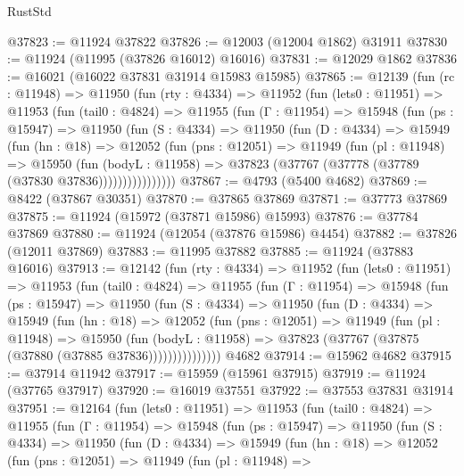 \begin{lexlean}{RustStd}
\begin{coremodule}
@37823 := @11924 @37822
@37826 := @12003 (@12004 @1862) @31911
@37830 := @11924 (@11995 (@37826 @16012) @16016)
@37831 := @12029 @1862
@37836 := @16021 (@16022 @37831 @31914 @15983 @15985)
@37865 := @12139
    (fun (rc : @11948) =>
    @11950
      (fun (rty : @4334) =>
      @11952
        (fun (lets0 : @11951) =>
        @11953
          (fun (tail0 : @4824) =>
          @11955
            (fun (Γ : @11954) =>
            @15948
              (fun (ps : @15947) =>
              @11950
                (fun (S : @4334) =>
                @11950
                  (fun (D : @4334) =>
                  @15949
                    (fun (hn : @18) =>
                    @12052
                      (fun (pns : @12051) =>
                      @11949
                        (fun (pl : @11948) =>
                        @15950
                          (fun (bodyL : @11958) =>
                          @37823 (@37767 (@37778 (@37789 (@37830 @37836))))))))))))))))
@37867 := @4793 (@5400 @4682)
@37869 := @8422 (@37867 @30351)
@37870 := @37865 @37869
@37871 := @37773 @37869
@37875 := @11924 (@15972 (@37871 @15986) @15993)
@37876 := @37784 @37869
@37880 := @11924 (@12054 (@37876 @15986) @4454)
@37882 := @37826 (@12011 @37869)
@37883 := @11995 @37882
@37885 := @11924 (@37883 @16016)
@37913 := @12142
    (fun (rty : @4334) =>
    @11952
      (fun (lets0 : @11951) =>
      @11953
        (fun (tail0 : @4824) =>
        @11955
          (fun (Γ : @11954) =>
          @15948
            (fun (ps : @15947) =>
            @11950
              (fun (S : @4334) =>
              @11950
                (fun (D : @4334) =>
                @15949
                  (fun (hn : @18) =>
                  @12052
                    (fun (pns : @12051) =>
                    @11949
                      (fun (pl : @11948) =>
                      @15950
                        (fun (bodyL : @11958) =>
                        @37823 (@37767 (@37875 (@37880 (@37885 @37836)))))))))))))))
    @4682
@37914 := @15962 @4682
@37915 := @37914 @11942
@37917 := @15959 (@15961 @37915)
@37919 := @11924 (@37765 @37917)
@37920 := @16019 @37551
@37922 := @37553 @37831 @31914
@37951 := @12164
    (fun (lets0 : @11951) =>
    @11953
      (fun (tail0 : @4824) =>
      @11955
        (fun (Γ : @11954) =>
        @15948
          (fun (ps : @15947) =>
          @11950
            (fun (S : @4334) =>
            @11950
              (fun (D : @4334) =>
              @15949
                (fun (hn : @18) =>
                @12052
                  (fun (pns : @12051) =>
                  @11949
                    (fun (pl : @11948) =>

\end{coremodule}
\end{lexlean}
